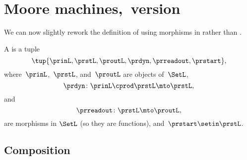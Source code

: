 
\section{Moore machines,~\SetL version}
We can now slightly rework the definition of  using morphisms in \SetL rather than \Set.
\begin{definition}
    \label{def:moore-machine}
    A  is a tuple
    \begin{equation}
        \label{eq:moore-tuple-improved-again}
        \tup{\prinL,\prstL,\proutL,\prdyn,\prreadout,\prstart},
    \end{equation}
    where~$\prinL$,~$\prstL$, and~$\proutL$ are objects of~$\SetL$,
    \begin{equation}
        \prdyn \colon \prinL \cprod \prstL \mto \prstL,
    \end{equation}
    and
    \begin{equation}
        \prreadout \colon \prstL \mto \proutL,
    \end{equation}
    are morphisms in $\SetL$ (so they are functions),
    and~$\prstart \setin \prstL$.
\end{definition}

\subsection{Composition}
\label{sec:composition-of-Moore-machines}

